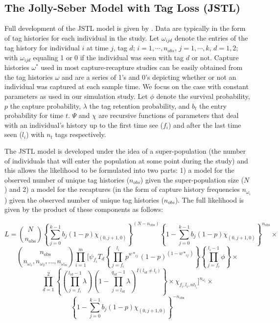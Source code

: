\documentclass[12pt]{article}
\begin{document}
\subsection{The Jolly-Seber Model with Tag Loss
(JSTL)}\label{the-jolly-seber-model-with-tag-loss-jstl}

Full development of the JSTL model is given by \citep{Cowen:2006}.  Data are typically in the form of tag histories for each individual in the study.  Let $\omega_{ijd}$ denote the entries of the tag history for individual $i$ at time $j$, tag $d$; $i=1, \cdots, n_{obs}$, $j=1, \cdots, k$, $d=1,2$; with $\omega_{ijd}$ equaling 1 or 0 if the individual was seen with tag $d$ or not.  Capture histories $\omega^*$ used in most capture-recapture studies can be easily obtained from the tag histories $\omega$ and are a series of 1's and 0's depicting whether or not an individual was captured at each sample time. We focus on the case with constant parameters as used in our simulation study.  Let $\phi$ denote the survival probability, $p$ the capture probability, $\lambda$ the tag retention probability, and $b_t$ the entry probability for time $t$.  $\Psi$ and $\chi$ are recursive functions of parameters that deal with an individual's history up to the first time see ($f_i$) and after the last time seen ($l_i$) with $n_t$ tags respectively.

The JSTL model is developed under the idea of a super-population (the number of individuals that will enter the population at some point during the study) \citep{Schwarz:1996} and this allows the likelihood to be formulated into two parts: 1) a model for the observed number of unique tag histories ($n_{obs}$) given the super-population size ($N$) and  2) a model for the recaptures (in the form of capture history frequencies $n_{\omega_i}$) given the observed number of unique tag histories ($n_{obs}$).  The full likelihood is given by the product of these components as follows:

\[
L=\binom{N}{n_\text{obs}} \left\{ \sum_{j=0}^{k-1} b_j(1-p)\chi_{(0,j+1,0)} \right\} ^{(N-n_\text{obs})} \left\{ 1- \sum_{j=0}^{k-1} b_j(1-p)\chi_{(0,j+1,0)} \right\} ^{n_\text{obs}} \times
\] \[
\binom{n_\text{obs}}{n_{\omega_1},n_{\omega_2},...,n_{\omega_m}} \prod_{i=1}^{m} \Bigg[ \psi_{f_i} T_d \left\{ \prod_{j=f_i}^{l_i} p^{w*_{ij}} (1-p)^{(1-w*_{ij})} \right\} \left\{ \prod_{j=f_i}^{l_i-1} \phi \right\} \times 
\] \[
\prod_{d=1}^{2} \left\{ \left( \prod_{j=f_i}^{l_{id}-1} \lambda \right) \left(1-\prod_{j=l_{id}}^{q_{id}-1} \lambda \right)^{I(l_{id} \neq l_i)} \right\} \times \chi_{f_i, l_i, nt_{l_i}} \Bigg]^{n_{\omega_i}} \times 
\] \[
\left\{ 1- \sum_{j=0}^{k-1} b_j(1-p)\chi_{(0,j+1,0)} \right\} ^{-n_\text{obs}}
\] 
\end{document}
